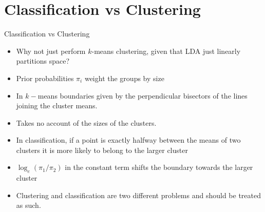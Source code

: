 \documentclass{beamer}
\begin{document}
\section{Classification vs Clustering}

\begin{frame}{Classification vs Clustering}
  \begin{itemize}
    \item Why not just perform $k$-means clustering, given that LDA just linearly partitions space?
    \item Prior probabilities $\pi_i$ weight the groups by size
    \item In $k-$means boundaries given by the perpendicular bisectors of the lines joining the cluster means.
    \item Takes no account of the sizes of the clusters.
    \item In classification, if a point is exactly halfway between the means of two clusters it is more likely to belong to the larger cluster 
    \item $\log_e(\pi_1/\pi_2)$ in the constant term shifts the boundary towards the larger cluster
    \item Clustering and classification are two different problems and should be treated as such.
  \end{itemize}
\end{frame}
\end{document}

